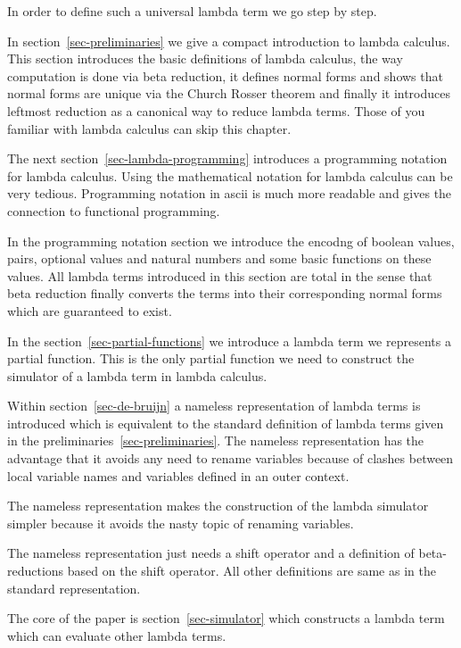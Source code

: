 \documentclass[12pt]{article}
\begin{document}
In order to define such a universal lambda term we go step by step.

In section~\ref{sec-preliminaries} we give a compact introduction to lambda
calculus. This section introduces the basic definitions of lambda calculus, the
way computation is done via beta reduction, it defines normal forms and shows
that normal forms are unique via the Church Rosser theorem and finally it
introduces leftmost reduction as a canonical way to reduce lambda terms. Those
of you familiar with lambda calculus can skip this chapter.


The next section~\ref{sec-lambda-programming} introduces a programming
notation for lambda calculus. Using the mathematical notation for lambda
calculus can be very tedious. Programming notation in ascii is much more
readable and gives the connection to functional programming.

In the programming notation section we introduce the encodng of boolean values,
pairs, optional values and natural numbers and some basic functions on these
values. All lambda terms introduced in this section are total in the sense that
beta reduction finally converts the terms into their corresponding normal forms
which are guaranteed to exist.


In the section~\ref{sec-partial-functions} we introduce a lambda term we
represents a partial function. This is the only partial function we need to
construct the simulator of a lambda term in lambda calculus.


Within section~\ref{sec-de-bruijn} a nameless representation of lambda terms is
introduced which is equivalent to the standard definition of lambda terms given
in the preliminaries~\ref{sec-preliminaries}. The nameless representation has
the advantage that it avoids any need to rename variables because of clashes
between local variable names and variables defined in an outer context.

The nameless representation makes the construction of the lambda simulator
simpler because it avoids the nasty topic of renaming variables.

The nameless representation just needs a shift operator and a definition of
beta-reductions based on the shift operator. All other definitions are same as
in the standard representation.



The core of the paper is section~\ref{sec-simulator} which constructs a lambda
term which can evaluate other lambda terms.
\end{document}
